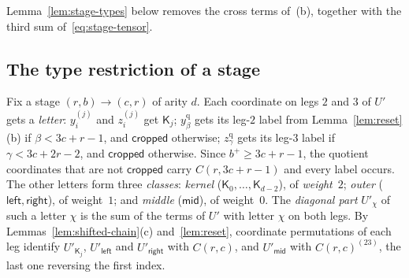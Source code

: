 Lemma~\ref{lem:stage-types} below removes the cross terms of~(b),
together with the third sum of~\eqref{eq:stage-tensor}.

\subsection{The type restriction of a stage}
\label{subsec:stage-types}

Fix a stage \((r,b)\to(c,r)\) of arity \(d\). Each coordinate on legs
\(2\) and \(3\) of \(U'\) gets a \emph{letter}: \(y^{(j)}_i\) and
\(z^{(j)}_i\) get \(\mathsf K_j\); \(y^{\mathrm q}_\beta\) gets its
leg-\(2\) label from Lemma~\ref{lem:reset}(b) if \(\beta<3c+r-1\), and
\(\mathsf{cropped}\) otherwise; \(z^{\mathrm q}_\gamma\) gets its leg-\(3\)
label if \(\gamma<3c+2r-2\), and \(\mathsf{cropped}\) otherwise. Since
\(b^+\ge3c+r-1\), the quotient coordinates that are not
\(\mathsf{cropped}\) carry \(C(r,3c+r-1)\) and every label occurs. The other letters form three \emph{classes}: \emph{kernel}
(\(\mathsf K_0,\ldots,\mathsf K_{d-2}\)), of \emph{weight}~\(2\);
\emph{outer} (\(\mathsf{left},\mathsf{right}\)), of weight~\(1\); and
\emph{middle} (\(\mathsf{mid}\)), of weight~\(0\). The \emph{diagonal
part} \(U'_\chi\) of such a letter \(\chi\) is the sum of the terms of
\(U'\) with letter \(\chi\) on both legs. By
Lemmas~\ref{lem:shifted-chain}(c) and~\ref{lem:reset}, coordinate
permutations of each leg identify \(U'_{\mathsf K_j}\),
\(U'_{\mathsf{left}}\) and \(U'_{\mathsf{right}}\) with \(C(r,c)\), and
\(U'_{\mathsf{mid}}\) with \(C(r,c)^{(23)}\), the last one reversing the
first index.

